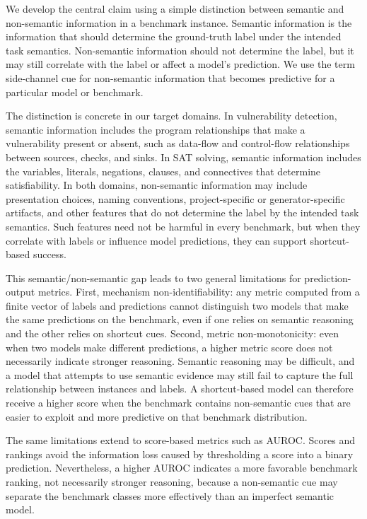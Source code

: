 \documentclass[acmsmall,screen,review,anonymous]{acmart}
\begin{document}
We develop the central claim using a simple distinction between semantic and
non-semantic information in a benchmark instance. Semantic information is the
information that should determine the ground-truth label under the intended
task semantics. Non-semantic information should not determine the label, but
it may still correlate with the label or affect a model's prediction. We use
the term side-channel cue for non-semantic information that becomes
predictive for a particular model or benchmark.

The distinction is concrete in our target domains. In vulnerability
detection, semantic information includes the program relationships that make
a vulnerability present or absent, such as data-flow and control-flow
relationships between sources, checks, and sinks. In SAT solving, semantic
information includes the variables, literals, negations, clauses, and
connectives that determine satisfiability. In both domains, non-semantic
information may include presentation choices, naming conventions,
project-specific or generator-specific artifacts, and other features that do
not determine the label by the intended task semantics. Such features need
not be harmful in every benchmark, but when they correlate with labels or
influence model predictions, they can support shortcut-based success.

This semantic/non-semantic gap leads to two general limitations for
prediction-output metrics. First, mechanism non-identifiability: any metric
computed from a finite vector of labels and predictions cannot distinguish
two models that make the same predictions on the benchmark, even if one
relies on semantic reasoning and the other relies on shortcut cues. Second,
metric non-monotonicity: even when two models make different predictions, a
higher metric score does not necessarily indicate stronger reasoning.
Semantic reasoning may be difficult, and a model that attempts to use
semantic evidence may still fail to capture the full relationship between
instances and labels. A shortcut-based model can therefore receive a higher
score when the benchmark contains non-semantic cues that are easier to
exploit and more predictive on that benchmark distribution.

The same limitations extend to score-based metrics such as AUROC. Scores and
rankings avoid the information loss caused by thresholding a score into a
binary prediction. Nevertheless, a higher AUROC indicates a more favorable
benchmark ranking, not necessarily stronger reasoning, because a
non-semantic cue may separate the benchmark classes more effectively than an
imperfect semantic model.
\end{document}

